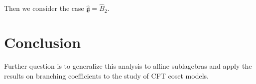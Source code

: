 \documentclass[12pt]{article}
\newtheorem{theorem}{Theorem}
\newtheorem{statement}{Statement}
\newcommand{\gf}{\mathfrak{g}}
\newcommand{\nfp}{\mathfrak{n}^{+}}
\newcommand{\nfm}{\mathfrak{n}^{-}}
\newcommand{\af}{\mathfrak{a}}
\newcommand{\hf}{\mathfrak{h}}
\newcommand{\gfh}{\hat{\mathfrak{g}}}
\newcommand{\bff}{\mathfrak{b}}
\begin{document}
Then we consider the case $\gfh=\hat B_{2}$.
\section*{Conclusion}
\label{sec:conclusion}
Further question is to generalize this analysis to affine sublagebras and apply the results on branching coefficients to the study of CFT coset models. 

{}

\end{document}

